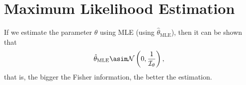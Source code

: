 \documentclass[11pt]{article}
\begin{document}
\section{Maximum Likelihood Estimation}

If we estimate the parameter $\theta$ using MLE (using $\hat{\theta}_{\text{MLE}}$),
then it can be shown that
\begin{align}\label{eq:mle}
	\hat{\theta}_{\text{MLE}}
	\asim
	\normal{0,\frac{1}{\mathcal{I}_{\theta}}},
\end{align}
that is, the bigger the Fisher information, the better the estimation.
\end{document}
